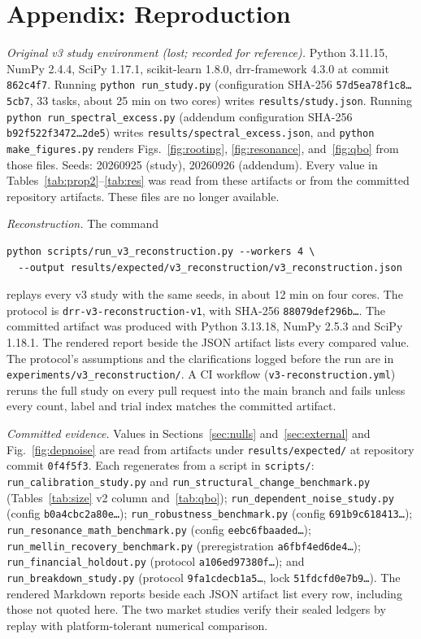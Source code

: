 \documentclass[10pt,twocolumn,letterpaper]{article}
\theoremstyle{definition}
\theoremstyle{remark}
\newcommand{\code}[1]{\texttt{#1}}
\begin{document}
\section*{Appendix: Reproduction}

\textit{Original v3 study environment (lost; recorded for reference).} Python 3.11.15, NumPy 2.4.4, SciPy 1.17.1,
scikit-learn 1.8.0, drr-framework 4.3.0 at commit \code{862c4f7}. Running
\code{python run\_study.py} (configuration SHA-256 \code{57d5ea78f1c8\ldots5cb7},
33 tasks, about 25 min on two cores) writes \code{results/study.json}. Running
\code{python run\_spectral\_excess.py} (addendum configuration SHA-256
\code{b92f522f3472\ldots2de5}) writes \code{results/spectral\_excess.json}, and
\code{python make\_figures.py} renders Figs.~\ref{fig:rooting}, \ref{fig:resonance},
and~\ref{fig:qbo} from those files. Seeds: 20260925 (study), 20260926 (addendum). Every value in
Tables~\ref{tab:prop2}--\ref{tab:res} was read from these artifacts or from the
committed repository artifacts. These files are no longer available.

\textit{Reconstruction.} The command
{\fontsize{6.1pt}{7.5pt}\selectfont
\begin{verbatim}
python scripts/run_v3_reconstruction.py --workers 4 \
  --output results/expected/v3_reconstruction/v3_reconstruction.json
\end{verbatim}}
\noindent replays every v3 study with the same seeds, in about 12 min on four
cores. The protocol is \code{drr-v3-reconstruction-v1}, with SHA-256
\code{88079def296b\ldots}. The committed artifact was produced with Python 3.13.18, NumPy 2.5.3 and SciPy 1.18.1. The rendered report
beside the JSON artifact lists every compared value. The protocol's assumptions
and the clarifications logged before the run are in
\code{experiments/v3\_reconstruction/}. A CI workflow
(\code{v3-reconstruction.yml}) reruns the full study on every pull request into
the main branch and fails unless every count, label and trial index matches the committed
artifact.

\textit{Committed evidence.} Values in Sections~\ref{sec:nulls}
and~\ref{sec:external} and Fig.~\ref{fig:depnoise} are read from artifacts under
\code{results/expected/} at repository commit \code{0f4f5f3}. Each regenerates
from a script in \code{scripts/}:
\code{run\_calibration\_study.py} and \code{run\_structural\_change\_benchmark.py}
(Tables~\ref{tab:size} v2 column and~\ref{tab:qbo});
\code{run\_dependent\_noise\_study.py} (config \code{b0a4cbc2a80e\ldots});
\code{run\_robustness\_benchmark.py} (config \code{691b9c618413\ldots});
\code{run\_resonance\_math\_benchmark.py} (config \code{eebc6fbaaded\ldots});
\code{run\_mellin\_recovery\_benchmark.py} (preregistration \code{a6fbf4ed6de4\ldots});
\code{run\_financial\_holdout.py} (protocol \code{a106ed97380f\ldots}); and
\code{run\_breakdown\_study.py} (protocol \code{9fa1cdecb1a5\ldots}, lock
\code{51fdcfd0e7b9\ldots}). The rendered Markdown reports beside each JSON
artifact list every row, including those not quoted here. The two market
studies verify their sealed ledgers by replay with platform-tolerant numerical
comparison.
\end{document}
